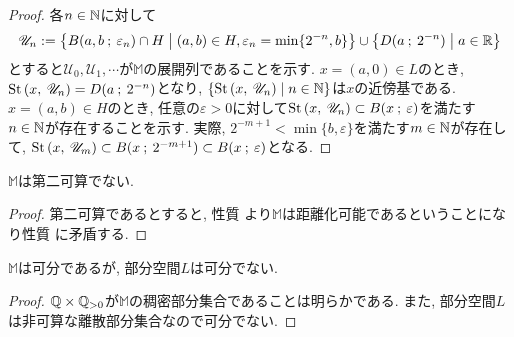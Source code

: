 \documentclass[uplatex, dvipdfmx, a4paper, 12pt, class=jsbook, crop=false]{standalone}
\begin{document}
\begin{proof}
	各$ n \in \mathbb{N} $に対して
		\[ \mathscr{U}_n \defeq \setcomp{B(a, b \semicolon \varepsilon_n) \cap H}{(a, b) \in H, \varepsilon_n = \min \{2^{-n}, b\}} \cup \setcomp{D(a \semicolon 2^{-n})}{a \in \R} \]
	とすると$ \mathscr{U}_0, \mathscr{U}_1, \cdots $が$ \mathbb{M} $の展開列であることを示す. $ x = (a, 0) \in L $のとき, $ \mathrm{St}\left(x , \: \mathscr{U}_n\right) = D(a \mathpunct{\: ; \:} 2^{-n}) $となり, $ \setcomp{\starset{x}{\mathscr{U}_n}}{n \in \N} $は$ x $の近傍基である. $ x = (a, b) \in H $のとき, 任意の$ \varepsilon > 0 $に対して$ \mathrm{St}\left(x , \: \mathscr{U}_n\right) \subset B(x \mathpunct{\: ; \:} \varepsilon) $を満たす$ n \in \mathbb{N} $が存在することを示す. 実際, 
	$ 2^{-m+1} < \min \{b, \varepsilon\} $を満たす$ m \in \mathbb{N} $が存在して, $ \mathrm{St}\left(x , \: \mathscr{U}_m\right) \subset B(x \mathpunct{\: ; \:} 2^{-m+1}) \subset B(x \mathpunct{\: ; \:} \varepsilon) $となる.  
\end{proof}

\begin{property}
	$ \mathbb{M} $は第二可算でない.
\end{property}

\begin{proof}
	第二可算であるとすると, 性質  より$ \mathbb{M} $は距離化可能であるということになり性質  に矛盾する.
\end{proof}


\begin{property}
	$ \mathbb{M} $は可分であるが, 部分空間$ L $は可分でない.
\end{property}

\begin{proof}
	$ \mathbb{Q} \times \mathbb{Q}_{>0} $が$ \mathbb{M} $の稠密部分集合であることは明らかである. また, 部分空間$ L $は非可算な離散部分集合なので可分でない.
\end{proof}
\end{document}
